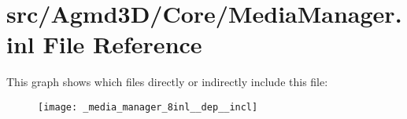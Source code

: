 \hypertarget{_media_manager_8inl}{\section{src/\+Agmd3\+D/\+Core/\+Media\+Manager.inl File Reference}
\label{_media_manager_8inl}
}
This graph shows which files directly or indirectly include this file\+:\nopagebreak
\begin{figure}[H]
\begin{center}
\leavevmode
\texttt{[image: \_media\_manager\_8inl\_\_dep\_\_incl]}
\end{center}
\end{figure}
